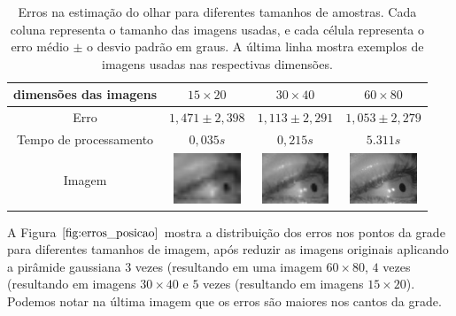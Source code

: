 \begin{table}
\centering
\begin{tabular}{| c | c | c | c |}
\hline
dimensões das imagens & $15 \times 20$ & $30 \times 40$ & $60 \times 80$ \\ \hline
Erro				  & $1,471 \pm 2,398$ & $1,113 \pm 2,291$ & $1,053 \pm 2,279$ \\ \hline
Tempo de processamento & $0,035s$ & $0,215s$ & $5.311s$ \\ \hline
Imagem & \vspace{2pt} \includegraphics[width=2cm]{imagens/olho_20_15.jpg} & \includegraphics[width=2cm]{imagens/olho_40_30.jpg} & \includegraphics[width=2cm]{imagens/olho_80_60.jpg} \\ \hline
\end{tabular}
\caption{Erros na estimação do olhar para diferentes tamanhos de amostras. Cada coluna representa o tamanho das imagens usadas, e cada célula representa o erro médio $\pm$ o desvio padrão em graus.  A última linha mostra exemplos de imagens usadas nas respectivas dimensões.}
\label{tab:erros}
\end{table}

A Figura $\ref{fig:erros_posicao}$ mostra a distribuição dos erros nos pontos da grade para diferentes tamanhos de imagem, após reduzir as imagens originais aplicando a pirâmide gaussiana $3$ vezes (resultando em uma imagem $60 \times 80$, $4$ vezes (resultando em imagens $30 \times 40$ e $5$ vezes (resultando em imagens $15 \times 20$). Podemos notar na última imagem que os erros são maiores nos cantos da grade.

